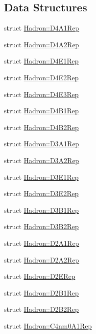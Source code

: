\subsection*{Data Structures}
\begin{DoxyCompactItemize}
\item 
struct \mbox{\hyperlink{structHadron_1_1D4A1Rep}{Hadron\+::\+D4\+A1\+Rep}}
\item 
struct \mbox{\hyperlink{structHadron_1_1D4A2Rep}{Hadron\+::\+D4\+A2\+Rep}}
\item 
struct \mbox{\hyperlink{structHadron_1_1D4E1Rep}{Hadron\+::\+D4\+E1\+Rep}}
\item 
struct \mbox{\hyperlink{structHadron_1_1D4E2Rep}{Hadron\+::\+D4\+E2\+Rep}}
\item 
struct \mbox{\hyperlink{structHadron_1_1D4E3Rep}{Hadron\+::\+D4\+E3\+Rep}}
\item 
struct \mbox{\hyperlink{structHadron_1_1D4B1Rep}{Hadron\+::\+D4\+B1\+Rep}}
\item 
struct \mbox{\hyperlink{structHadron_1_1D4B2Rep}{Hadron\+::\+D4\+B2\+Rep}}
\item 
struct \mbox{\hyperlink{structHadron_1_1D3A1Rep}{Hadron\+::\+D3\+A1\+Rep}}
\item 
struct \mbox{\hyperlink{structHadron_1_1D3A2Rep}{Hadron\+::\+D3\+A2\+Rep}}
\item 
struct \mbox{\hyperlink{structHadron_1_1D3E1Rep}{Hadron\+::\+D3\+E1\+Rep}}
\item 
struct \mbox{\hyperlink{structHadron_1_1D3E2Rep}{Hadron\+::\+D3\+E2\+Rep}}
\item 
struct \mbox{\hyperlink{structHadron_1_1D3B1Rep}{Hadron\+::\+D3\+B1\+Rep}}
\item 
struct \mbox{\hyperlink{structHadron_1_1D3B2Rep}{Hadron\+::\+D3\+B2\+Rep}}
\item 
struct \mbox{\hyperlink{structHadron_1_1D2A1Rep}{Hadron\+::\+D2\+A1\+Rep}}
\item 
struct \mbox{\hyperlink{structHadron_1_1D2A2Rep}{Hadron\+::\+D2\+A2\+Rep}}
\item 
struct \mbox{\hyperlink{structHadron_1_1D2ERep}{Hadron\+::\+D2\+E\+Rep}}
\item 
struct \mbox{\hyperlink{structHadron_1_1D2B1Rep}{Hadron\+::\+D2\+B1\+Rep}}
\item 
struct \mbox{\hyperlink{structHadron_1_1D2B2Rep}{Hadron\+::\+D2\+B2\+Rep}}
\item 
struct \mbox{\hyperlink{structHadron_1_1C4nm0A1Rep}{Hadron\+::\+C4nm0\+A1\+Rep}}
\item 

\end{DoxyCompactItemize}
